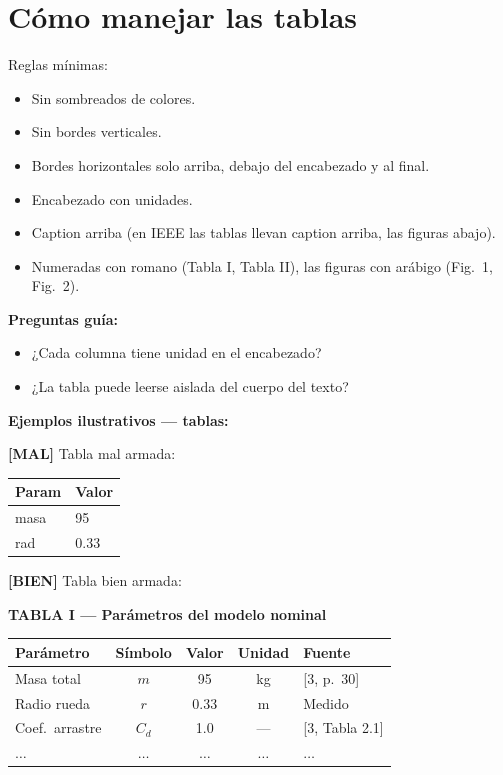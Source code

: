 \documentclass[11pt,a4paper]{article}
\newcommand{\malo}{\textcolor{red!70!black}{\textbf{[MAL]}}}
\newcommand{\bueno}{\textcolor{green!50!black}{\textbf{[BIEN]}}}
\begin{document}
\hrulefill

\section{Cómo manejar las tablas}

Reglas mínimas:

\begin{itemize}
    \item Sin sombreados de colores.
    \item Sin bordes verticales.
    \item Bordes horizontales solo arriba, debajo del encabezado y al final.
    \item Encabezado con unidades.
    \item Caption arriba (en IEEE las tablas llevan caption arriba, las figuras abajo).
    \item Numeradas con romano (Tabla I, Tabla II), las figuras con arábigo (Fig.~1, Fig.~2).
\end{itemize}

\begin{guia}
\textbf{Preguntas guía:}
\begin{itemize}
    \item ¿Cada columna tiene unidad en el encabezado?
    \item ¿La tabla puede leerse aislada del cuerpo del texto?
\end{itemize}
\end{guia}

\begin{ejemplo}
\textbf{Ejemplos ilustrativos --- tablas:}

\malo{} Tabla mal armada:

\begin{tabular}{ll}
\toprule
Param & Valor \\
\midrule
masa & 95 \\
rad  & 0.33 \\
\bottomrule
\end{tabular}

\medskip

\bueno{} Tabla bien armada:

\textbf{TABLA I --- Parámetros del modelo nominal}

\begin{tabular}{l c c c l}
\toprule
Parámetro & Símbolo & Valor & Unidad & Fuente \\
\midrule
Masa total      & $m$    & 95   & kg & [3, p.~30] \\
Radio rueda     & $r$    & 0.33 & m  & Medido \\
Coef.\ arrastre & $C_d$  & 1.0  & ---& [3, Tabla 2.1] \\
$\dots$ & $\dots$ & $\dots$ & $\dots$ & $\dots$ \\
\bottomrule
\end{tabular}
\end{ejemplo}
\end{document}
